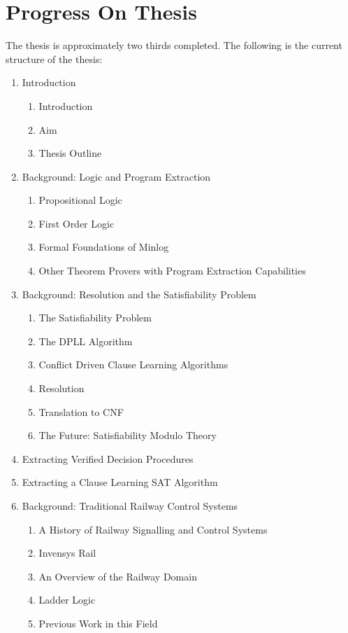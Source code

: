 \documentclass{article}
\begin{document}
\section{Progress On Thesis}
The thesis is approximately two thirds completed. The following is the current structure of the thesis: 
\begin{enumerate}
\item  Introduction  
\begin{enumerate}  [label*=\arabic*.]
\item  Introduction 
\item  Aim
\item  Thesis Outline
\end{enumerate}
\item Background: Logic and Program Extraction 
\begin{enumerate}[label*=\arabic*.]
\item Propositional Logic 
\item First Order Logic 
\item Formal Foundations of Minlog 
\item  Other Theorem Provers with Program Extraction Capabilities
\end{enumerate}
\item Background: Resolution and the Satisfiability Problem 
\begin{enumerate}[label*=\arabic*.]
\item The Satisfiability Problem
\item The DPLL Algorithm
\item Conflict Driven Clause Learning Algorithms
\item Resolution
\item Translation to CNF
\item The Future: Satisfiability Modulo Theory
\end{enumerate}
\item Extracting Verified Decision Procedures 
\item Extracting a Clause Learning SAT Algorithm
\item Background: Traditional Railway Control Systems 
\begin{enumerate}[label*=\arabic*.]
\item A History of Railway Signalling and Control Systems 
\item Invensys Rail 
\item An Overview of the Railway Domain 
\item Ladder Logic 
\item Previous Work in this Field

\end{enumerate}
\end{enumerate}
\end{document}
